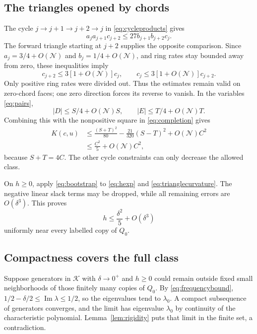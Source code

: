 \documentclass[11pt,a4paper]{article}
\newcommand{\K}{\mathcal K}
\newcommand{\Ima}{\operatorname{Im}}
\newcommand{\Nloc}{\mathcal N}
\begin{document}
\subsection{The triangles opened by chords}

The cycle $j\to j+1\to j+2\to j$ in
\eqref{eq:cycleproducts} gives
\begin{equation}\label{eq:triangle}
 a_ja_{j+1}c_{j+2}\leq27b_{j+1}b_{j+2}c_j.
\end{equation}
The forward triangle starting at $j+2$ supplies the opposite comparison.
Since $a_j=3/4+O(\Nloc)$ and $b_j=1/4+O(\Nloc)$, and ring
rates stay bounded away from zero, these inequalities imply
\begin{equation}\label{eq:chordratios}
 c_{j+2}\leq3[1+O(\Nloc)]c_j,\qquad
 c_j\leq3[1+O(\Nloc)]c_{j+2}.
\end{equation}
Only positive ring rates were divided out. Thus the estimates remain
valid on zero-chord faces; one zero direction forces its reverse to
vanish. In the variables \eqref{eq:pairs},
\begin{equation}\label{eq:pairbound}
 |D|\leq S/4+O(\Nloc)S,\qquad
 |E|\leq T/4+O(\Nloc)T.
\end{equation}
Combining this with the nonpositive square in
\eqref{eq:completion} gives
\begin{align}
 K(c,u)&\leq\frac{(S+T)^2}{80}
       -\frac{21}{320}(S-T)^2+O(\Nloc)C^2\nonumber\\
       &\leq\frac{C^2}{5}+O(\Nloc)C^2,\label{eq:trianglecurvature}
\end{align}
because $S+T=4C$. The other cycle constraints can only decrease
the allowed class.

On $h\geq0$, apply \eqref{eq:bootstrap} to
\eqref{eq:hexp} and \eqref{eq:trianglecurvature}. The negative
linear slack terms may be dropped, while all remaining errors are
$O(\delta^3)$. This proves
\begin{equation}\label{eq:localfinal}
 h\leq\frac{\delta^2}{5}+O(\delta^3)
\end{equation}
uniformly near every labelled copy of $Q_0$.

\subsection{Compactness covers the full class}

Suppose generators in $\K$ with $\delta\to0^+$ and $h\geq0$
could remain outside fixed small neighborhoods of those finitely many
copies of $Q_0$. By \eqref{eq:frequencybound},
$1/2-\delta/2\leq\Ima\lambda\leq1/2$, so the eigenvalues tend to
$\lambda_0$. A compact subsequence of generators converges, and the
limit has eigenvalue $\lambda_0$ by continuity of the characteristic
polynomial. Lemma~\ref{lem:rigidity} puts that limit in the finite
set, a contradiction.
\end{document}
